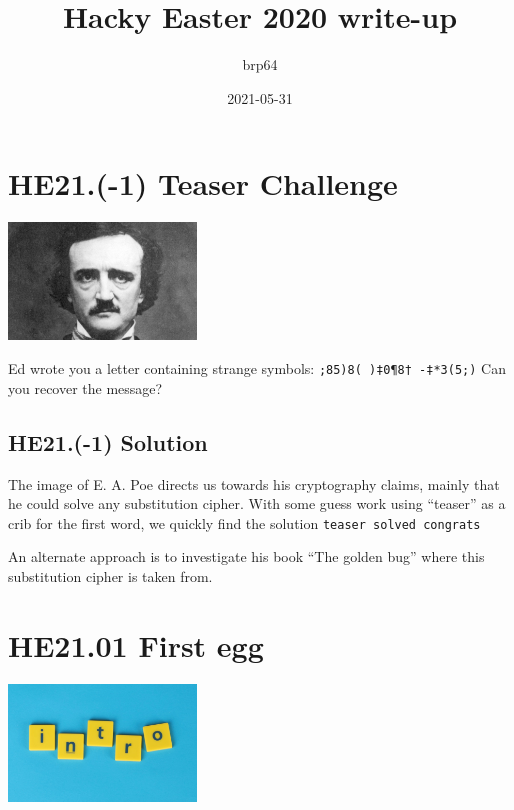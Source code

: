 \documentclass[english,a4paper,nols,noindent]{tufte-handout}
\title{Hacky Easter 2020 write-up}
\author{brp64}
\date{2021-05-31}
\begin{document}
\maketitle

  
\hypertarget{he21.-1}{%
  \section{HE21.(-1) Teaser Challenge}
  \label{sec:HE21.-1}}

\begin{marginfigure}
  \includegraphics[width=50mm]{images/banner.jpg}
\end{marginfigure}
Ed wrote you a letter containing strange symbols: 
\verb+;85)8( )‡0¶8† -‡*3(5;)+
Can you recover the message?


\hypertarget{HE21.-1}{%
\subsection{HE21.(-1) Solution}\label{he21.-1}}
The image of E. A. Poe directs us towards his cryptography claims,
mainly that he could solve any substitution cipher.  With some guess
work using ``teaser'' as a crib for the first word, we quickly find
the solution \verb+teaser solved congrats+

An alternate approach is to investigate his book ``The golden bug''
where this substitution cipher is taken from.

\hypertarget{HE21.01-first-egg}{%
\section{HE21.01 First egg}\label{HE21.01-first-egg}}

\begin{marginfigure}
    \includegraphics[width=50mm]{images/challenge1.jpg}
\end{marginfigure}
\end{document}
